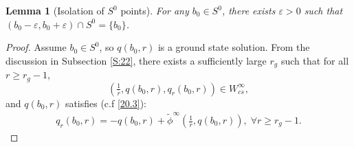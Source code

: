 \documentclass[12pt]{amsart}
\newcommand{\eps}{\varepsilon}
\newtheorem{lemma}[theorem]{Lemma}
\begin{document}
\begin{lemma}[Isolation of $S^0$ points]\label{lm: i}
For any $b_0\in S^0$, there exists $\eps>0$ such that  $(b_0-\eps, b_0+\eps) \cap S^0=\{b_0\} $. 
\end{lemma}
\begin{proof} Assume $b_0\in S^0$, so $q(b_0, r)$ is a ground state solution. From the discussion in Subsection \ref{S:22}, there exists a  sufficiently large $r_g$ such that for all $r\ge r_g-1$,
\[
(\tfrac 1r, q(b_0,r), q_r(b_0,r))\in W_{cs}^\infty,
\]
and $q(b_0,r)$ satisfies (c.f \eqref{20.3}):
\begin{align}\label{81}
q_r(b_0,r)=-q(b_0,r)+\tilde\phi^\infty(\tfrac 1r, q(b_0,r)), \; \forall r\ge r_g-1. 
\end{align}



\end{proof}
\end{document}
